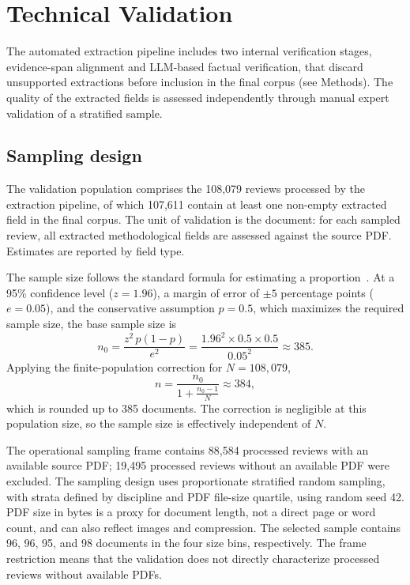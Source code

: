 \section*{Technical Validation}

The automated extraction pipeline includes two internal verification stages, evidence-span alignment and LLM-based factual verification, that discard unsupported extractions before inclusion in the final corpus (see Methods). The quality of the extracted fields is assessed independently through manual expert validation of a stratified sample.

\subsection*{Sampling design}
The validation population comprises the 108,079 reviews processed by the extraction pipeline, of which 107,611 contain at least one non-empty extracted field in the final corpus. The unit of validation is the document: for each sampled review, all extracted methodological fields are assessed against the source PDF. Estimates are reported by field type.

The sample size follows the standard formula for estimating a proportion~\cite{cochran:1977}. At a 95\% confidence level ($z = 1.96$), a margin of error of $\pm 5$ percentage points ($e = 0.05$), and the conservative assumption $p = 0.5$, which maximizes the required sample size, the base sample size is
\[
n_0 = \frac{z^2 \, p(1-p)}{e^2} = \frac{1.96^2 \times 0.5 \times 0.5}{0.05^2} \approx 385.
\]
Applying the finite-population correction for $N = 108{,}079$,
\[
n = \frac{n_0}{1 + \frac{n_0 - 1}{N}} \approx 384,
\]
which is rounded up to 385 documents. The correction is negligible at this population size, so the sample size is effectively independent of $N$.

The operational sampling frame contains 88,584 processed reviews with an available source PDF; 19,495 processed reviews without an available PDF were excluded. The sampling design uses proportionate stratified random sampling, with strata defined by discipline and PDF file-size quartile, using random seed 42. PDF size in bytes is a proxy for document length, not a direct page or word count, and can also reflect images and compression. The selected sample contains 96, 96, 95, and 98 documents in the four size bins, respectively. The frame restriction means that the validation does not directly characterize processed reviews without available PDFs.

